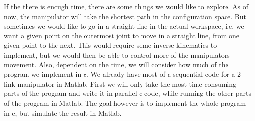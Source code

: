 If the there is enough time, there are some things we would like to explore. As of now, the manipulator will take the shortest path in the configuration space. But sometimes we would like to go in a straight line in the actual workspace, i.e. we want a given point on the outermost joint to move in a straight line, from one given point to the next. This would require some inverse kinematics to implement, but we would then be able to control more of the manipulators movement. Also, dependent on the time, we will consider how much of the program we implement in c. We already have most of a sequential code for a 2-link manipulator in Matlab. First we will only take the most time-consuming parts of the program and write it in parallel c-code, while running the other parts of the program in Matlab. The goal however is to implement the whole program in c, but simulate the result in Matlab.
















